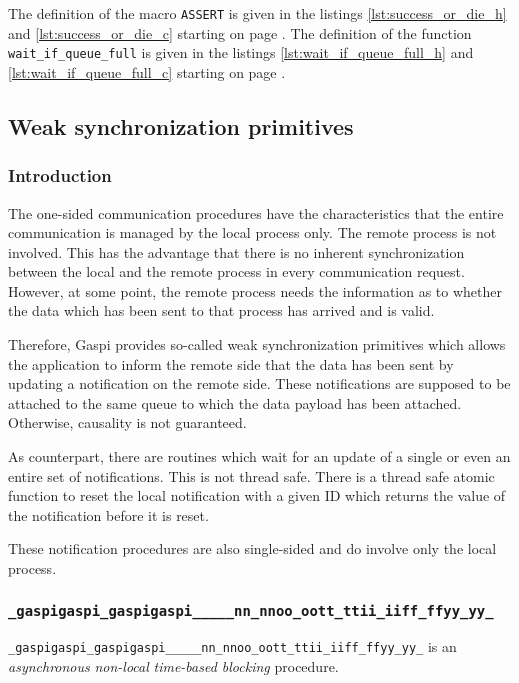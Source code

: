 \documentclass{article}
\makeatletter
\newlength{\st}\setlength{\st}{0pt}
\newcommand{\zerowsep}{\hskip 0pt plus 0.1pt minus 0.1pt}
\newcommand{\ZSEP}[1]{\ifx#1\@@@EOZ@@@\let\next\relax\else\ifx#1\_#1\zerowsep\else#1\fi\let\next\ZSEP\fi\next}
\newcommand{\zsep}[1]{\ZSEP{}#1\@@@EOZ@@@}
\newcommand{\gaspiprefix}{gaspi}
\newcommand{\GASPI}{{\sc Gaspi}}
\newcommand{\function}[1]{{\tt #1}}
\newcommand{\gaspifunction}[1]{\function{\protect\zsep{\gaspiprefix\_#1}}}
\newcommand{\gaspisemantic}[1]{{\emph{#1}}}
\makeatother
\begin{document}
The definition of the macro \verb|ASSERT| is given in the listings
\ref{lst:success_or_die_h} and \ref{lst:success_or_die_c} starting on
page \pageref{lst:success_or_die_h}. The definition of the function
\verb|wait_if_queue_full| is given in the listings
\ref{lst:wait_if_queue_full_h} and \ref{lst:wait_if_queue_full_c}
starting on page \pageref{lst:wait_if_queue_full_h}.

\subsection{Weak synchronization primitives}


\subsubsection{Introduction}

The one-sided communication procedures have the characteristics that the 
entire communication is managed by the local process only. The 
remote process is not involved. This has the advantage that there
is no inherent synchronization between the local and the remote 
process in every communication request. However, at some point,
the remote process needs the information as to whether the data
which has been sent to that process has arrived and is valid.

Therefore, \GASPI{} provides so-called weak synchronization 
primitives which allows the application to inform the remote side that
the data has been sent by updating a notification on the remote
side. These notifications are supposed to be attached
to the same queue to which the data payload has been 
attached. Otherwise, causality is not guaranteed.  

As counterpart, there are 
routines which wait for an update of a single or even an entire set of 
notifications. This is not thread safe. There is a thread safe atomic function
to reset the local notification with a given ID which returns the value 
of the notification before it is reset. 

These notification procedures are also single-sided and do
involve only the local process.  


\subsubsection{\gaspifunction{notify}}

\gaspifunction{notify} is an \gaspisemantic{asynchronous} \gaspisemantic{non-local}
\gaspisemantic{time-based blocking} procedure.
\end{document}
